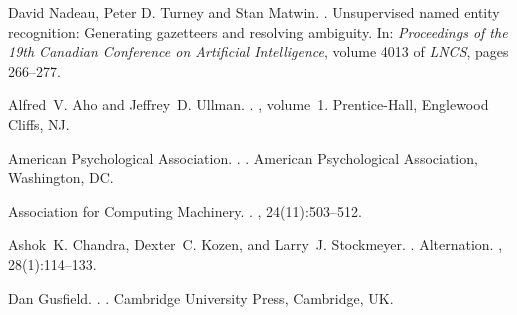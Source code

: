 \documentclass[11pt]{article}
\begin{document}
\begin{thebibliography}{}
David Nadeau, Peter D. Turney and Stan Matwin.
.
\newblock Unsupervised named entity recognition: Generating gazetteers and resolving ambiguity. 
\newblock In: {\em Proceedings of the 19th Canadian Conference on Artificial Intelligence}, volume 4013 of {\em LNCS}, pages 266--277.

Alfred~V. Aho and Jeffrey~D. Ullman.
.
, volume~1.
\newblock Prentice-{Hall}, Englewood Cliffs, NJ.

{American Psychological Association}.
.
.
\newblock American Psychological Association, Washington, DC.

{Association for Computing Machinery}.
.
, 24(11):503--512.

Ashok~K. Chandra, Dexter~C. Kozen, and Larry~J. Stockmeyer.
.
\newblock Alternation.
,
  28(1):114--133.

Dan Gusfield.
.
.
\newblock Cambridge University Press, Cambridge, UK.

\end{thebibliography}
\end{document}
